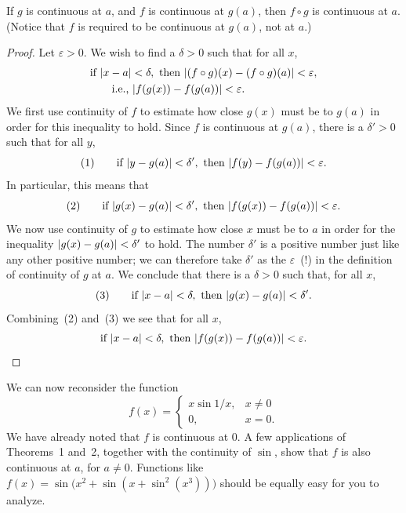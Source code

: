 \begin{theorem}
If $g$ is continuous at $a$, and $f$ is continuous at $g(a)$, then
$f \circ g$ is continuous at $a$. (Notice that $f$ is required to be
continuous at $g(a)$, not at $a$.)
\end{theorem}

\begin{proof}
Let $\varepsilon > 0$. We wish to find a $\delta > 0$ such that for all
$x$,
\begin{align*}
&\text{if } \lvert x - a\rvert < \delta, \text{ then }
  \lvert(f \circ g)(x) - (f \circ g)(a)\rvert < \varepsilon, \\
&\qquad\text{i.e., } \lvert f(g(x)) - f(g(a))\rvert < \varepsilon.
\end{align*}
We first use continuity of $f$ to estimate how close $g(x)$ must be to
$g(a)$ in order for this inequality to hold. Since $f$ is continuous at
$g(a)$, there is a $\delta' > 0$ such that for all $y$,
\[
(1)\qquad
\text{if } \lvert y - g(a)\rvert < \delta',\ \text{then }
\lvert f(y) - f(g(a))\rvert < \varepsilon.
\]
In particular, this means that
\[
(2)\qquad
\text{if } \lvert g(x) - g(a)\rvert < \delta',\ \text{then }
\lvert f(g(x)) - f(g(a))\rvert < \varepsilon.
\]
We now use continuity of $g$ to estimate how close $x$ must be to $a$
in order for the inequality $\lvert g(x) - g(a)\rvert < \delta'$ to hold. The
number $\delta'$ is a positive number just like any other positive
number; we can therefore take $\delta'$ as the $\varepsilon$~(!) in the
definition of continuity of $g$ at $a$. We conclude that there is a
$\delta > 0$ such that, for all $x$,
\[
(3)\qquad
\text{if } \lvert x - a\rvert < \delta,\ \text{then }
\lvert g(x) - g(a)\rvert < \delta'.
\]
Combining~(2) and~(3) we see that for all $x$,
\[
\text{if } \abs{x - a} < \delta,\ \text{then }
\abs{f(g(x)) - f(g(a))} < \varepsilon.
\]
\end{proof}

We can now reconsider the function
\[
f(x) =
\begin{cases}
x \sin 1/x, & x \neq 0 \\
0,          & x = 0.
\end{cases}
\]
We have already noted that $f$ is continuous at $0$. A few applications
of Theorems~1 and~2, together with the continuity of $\sin$, show that
$f$ is also continuous at $a$, for $a \neq 0$. Functions like
$f(x) = \sin\bigl(x^2 + \sin(x + \sin^2(x^3))\bigr)$ should be equally
easy for you to analyze.

